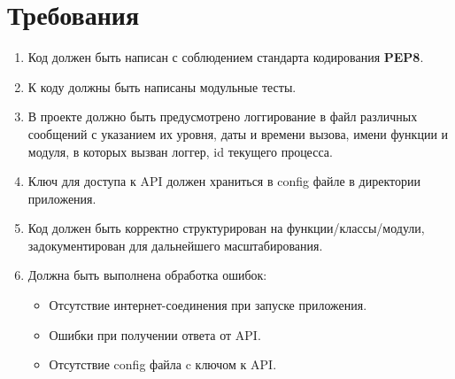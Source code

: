 \documentclass[a4paper,12pt]{report}
\begin{document}
\section{Требования}
\begin{enumerate}
\item{Код должен быть написан с соблюдением стандарта кодирования \textbf{PEP8}.}
\item{К коду должны быть написаны модульные тесты.}
\item{В проекте должно быть предусмотрено логгирование в файл различных 
    сообщений с указанием их уровня, даты и времени вызова, имени функции и
    модуля, в которых вызван логгер, id текущего процесса.}
\item{Ключ для доступа к API должен храниться в config файле в директории приложения.}
\item{Код должен быть корректно структурирован на функции/классы/модули, 
    задокументирован для дальнейшего масштабирования.}
\item{Должна быть выполнена обработка ошибок:}
\begin{itemize}
\item{Отсутствие интернет-соединения при запуске приложения.}
\item{Ошибки при получении ответа от API.}
\item{Отсутствие config файла c ключом к API.}
\end{itemize}
\end{enumerate}
\end{document}

